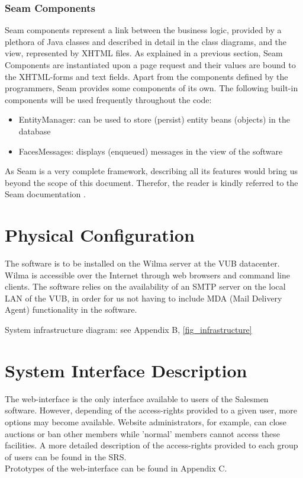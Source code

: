 \documentclass[salesmen, twoside]{../../../templates/latex/2009/softproj}
\begin{document}
\begin{projdoc}
\subsubsection{Seam Components}
\label{sec_seam_components}
Seam components represent a link between the business logic, provided by a plethora of Java classes and described in detail in the class diagrams, and the view, represented by XHTML files. As explained in a previous section, Seam Components are instantiated upon a page request and their values are bound to the XHTML-forms and text fields.  Apart from the components defined by the programmers, Seam provides some components of its own. The following built-in components will be used frequently throughout the code:
\begin{itemize}
\item EntityManager: can be used to store (persist) entity beans (objects) in the database
\item FacesMessages: displays (enqueued) messages in the view of the software
\end{itemize}

As Seam is a very complete framework, describing all its features would bring us beyond the scope of this document. Therefor, the reader is kindly referred to the Seam documentation \cite{seam_doc}.


\section{Physical Configuration}
The software is to be installed on the Wilma server at the VUB datacenter. Wilma is accessible over the Internet through web browsers and command line clients. The software relies on the availability of an SMTP server on the local LAN of the VUB, in order for us not having to include MDA (Mail Delivery Agent) functionality in the software.

System infrastructure diagram: see Appendix B, \ref{fig_infrastructure}


\section{System Interface Description}
The web-interface is the only interface available to users of the Salesmen software. However, depending of the access-rights provided to a given user, more options may become available. Website administrators, for example, can close auctions or ban other members while 'normal' members cannot access these facilities. A more detailed description of the access-rights provided to each group of users can be found in the SRS.\\
Prototypes of the web-interface can be found in Appendix C.



\end{projdoc}
\end{document}
